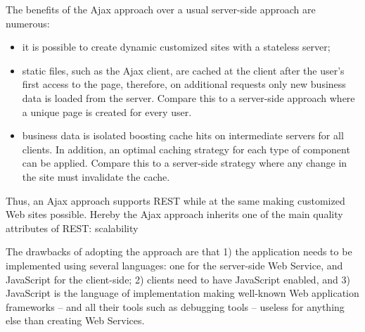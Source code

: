 The benefits of the Ajax approach over a usual server-side approach are numerous:
\begin{itemize}
  \item it is possible to create dynamic customized sites with a stateless
server;
  \item static files, such as the Ajax client, are cached at the client after the
user's first access to the page, therefore, on additional requests only new
business data is loaded from the server. Compare this to a server-side approach
where a unique page is created for every user.
\item business data is isolated boosting cache hits on intermediate servers for
all clients. In addition, an optimal caching strategy for each type of component
can be applied. Compare this to a server-side strategy where any change in
the site must invalidate the cache.
\end{itemize}
Thus, an Ajax approach supports REST while at the same making customized Web
sites possible. Hereby the Ajax approach inherits one of the main quality
attributes of REST: scalability \citep[p.116]{rest:Fielding02}

The drawbacks of adopting the approach are that 1) the application needs to be
implemented using several languages: one for the server-side Web Service, and
JavaScript for the client-side; 2) clients need to have JavaScript enabled, and
3) JavaScript is the language of implementation making well-known Web application
frameworks -- and all their tools such as debugging tools -- useless for anything
else than creating Web Services.



